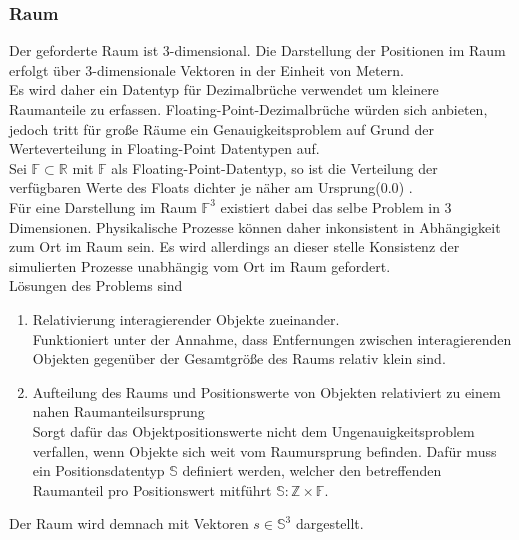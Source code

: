 \subsubsection{Raum}
Der geforderte Raum ist 3-dimensional. Die Darstellung der Positionen im Raum erfolgt über 3-dimensionale Vektoren in der Einheit von Metern.\\
Es wird daher ein Datentyp für Dezimalbrüche verwendet um kleinere Raumanteile zu erfassen.
Floating-Point-Dezimalbrüche würden sich anbieten, jedoch tritt für große Räume ein Genauigkeitsproblem auf Grund der Werteverteilung in Floating-Point Datentypen auf.\\
Sei $\mathbb{F} \subset \mathbb{R}$ mit $\mathbb{F}$ als Floating-Point-Datentyp, so ist die Verteilung der verfügbaren Werte des Floats dichter je näher am Ursprung($0.0$) \cite{floatdistribution}.\\
Für eine Darstellung im Raum $\mathbb{F}^3$ existiert dabei das selbe Problem in 3 Dimensionen. Physikalische Prozesse können daher inkonsistent in Abhängigkeit zum Ort im Raum sein.
Es wird allerdings an dieser stelle Konsistenz der simulierten Prozesse unabhängig vom Ort im Raum gefordert.\\
Lösungen des Problems sind
\begin{enumerate}
	\item Relativierung interagierender Objekte zueinander.\\
		Funktioniert unter der Annahme, dass Entfernungen zwischen interagierenden Objekten gegenüber der Gesamtgröße des Raums relativ klein sind.
	\item Aufteilung des Raums und Positionswerte von Objekten relativiert zu einem nahen Raumanteilsursprung\\
		Sorgt dafür das Objektpositionswerte nicht dem Ungenauigkeitsproblem verfallen, wenn Objekte sich weit vom Raumursprung befinden. Dafür muss ein Positionsdatentyp $\mathbb{S}$ definiert werden, welcher den betreffenden Raumanteil pro Positionswert mitführt $\mathbb{S}:\mathbb{Z}\times\mathbb{F}$.
\end{enumerate}

Der Raum wird demnach mit Vektoren $s\in\mathbb{S}^3$ dargestellt.

